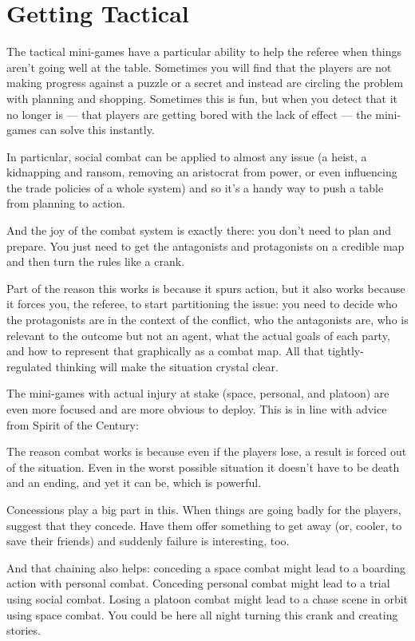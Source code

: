 \section{Getting Tactical}
\label{sec:getting-tactical}

The tactical mini-games have a particular ability to help the referee when things aren't going well at the table. Sometimes you will find that the players are not making progress against a puzzle or a secret and instead are circling the problem with planning and shopping. Sometimes this is fun, but when you detect that it no longer is --- that players are getting bored with the lack of effect --- the mini-games can solve this instantly.

In particular, social combat can be applied to almost any issue (a heist, a kidnapping and ransom, removing an aristocrat from power, or even influencing the trade policies of a whole system) and so it's a handy way to push a table from planning to action.

And the joy of the combat system is exactly there: you don't need to plan and prepare. You just need to get the antagonists and protagonists on a credible map and then turn the rules like a crank.

Part of the reason this works is because it spurs action, but it also works because it forces you, the referee, to start partitioning the issue: you need to decide who the protagonists are in the context of the conflict, who the antagonists are, who is relevant to the outcome but not an agent, what the actual goals of each party, and how to represent that graphically as a combat map. All that tightly-regulated thinking will make the situation crystal clear.

{\newpage}{}
The mini-games with actual injury at stake (space, personal, and platoon) are even more focused and are more obvious to deploy. This is in line with advice from Spirit of the Century:


The reason combat works is because even if the players lose, a result is forced out of the situation. Even in the worst possible situation it doesn't have to be death and an ending, and yet it can be, which is powerful.

Concessions play a big part in this. When things are going badly for the players, suggest that they concede. Have them offer something to get away (or, cooler, to save their friends) and suddenly failure is interesting, too.


And that chaining also helps: conceding a space combat might lead to a boarding action with personal combat. Conceding personal combat might lead to a trial using social combat. Losing a platoon combat might lead to a chase scene in orbit using space combat. You could be here all night turning this crank and creating stories.

